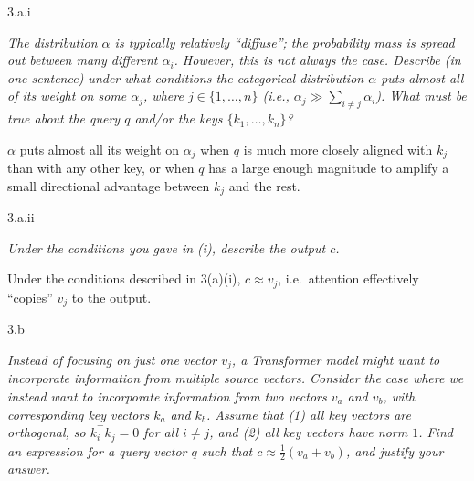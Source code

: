 \LARGE
3.a.i
\normalsize

\textit{The distribution $\alpha$ is typically relatively ``diffuse''; the probability mass is spread out between many different $\alpha_i$. However, this is not always the case. Describe (in one sentence) under what conditions the categorical distribution $\alpha$ puts almost all of its weight on some $\alpha_j$, where $j \in \{1, \ldots, n\}$ (i.e., $\alpha_j \gg \sum_{i \neq j} \alpha_i$). What must be true about the query $q$ and/or the keys $\{k_1, \ldots, k_n\}$?}

\bigskip


\begin{answer}
    $\alpha$ puts almost all its weight on $\alpha_j$ when $q$ is much more
    closely aligned with $k_j$ than with any other key, or when $q$ has a
    large enough magnitude to amplify a small directional advantage between
    $k_j$ and the rest.
\end{answer}


\clearpage

\LARGE
3.a.ii
\normalsize

\textit{Under the conditions you gave in (i), describe the output $c$.}

\bigskip


\begin{answer}
    Under the conditions described in 3(a)(i), $c \approx v_j$, i.e.\ attention
    effectively ``copies'' $v_j$ to the output.
\end{answer}


\clearpage

\LARGE
3.b
\normalsize

\textit{Instead of focusing on just one vector $v_j$, a Transformer model might want to incorporate information from multiple source vectors. Consider the case where we instead want to incorporate information from two vectors $v_a$ and $v_b$, with corresponding key vectors $k_a$ and $k_b$. Assume that (1) all key vectors are orthogonal, so $k_i^\top k_j = 0$ for all $i \neq j$, and (2) all key vectors have norm $1$. Find an expression for a query vector $q$ such that $c \approx \frac{1}{2}(v_a + v_b)$, and justify your answer.}

